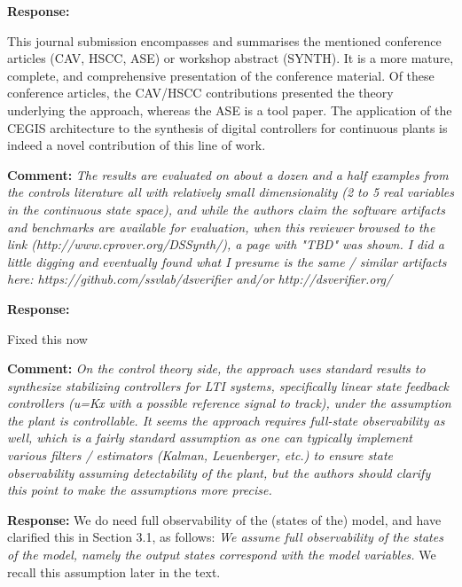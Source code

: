 \documentclass{article}
\begin{document}
{\bf Response: }

This journal submission encompasses and summarises the mentioned conference articles (CAV, HSCC, ASE) or workshop abstract (SYNTH). 
It is a more mature, complete, and comprehensive presentation of the conference material. 
Of these conference articles, the CAV/HSCC contributions presented the theory underlying the approach, 
whereas the ASE is a tool paper. 
The application of the CEGIS architecture to the synthesis of digital controllers for continuous plants is indeed a novel contribution of this line of
work. 


\vspace{2em}
{\bf Comment: } {\itshape The results are evaluated on about a dozen and a half examples from the controls literature all with relatively small
dimensionality (2 to 5 real variables in the continuous state space), and while the authors claim the software artifacts and benchmarks are available
for evaluation, when this reviewer browsed to the link (http://www.cprover.org/DSSynth/), a page with "TBD" was shown. I did a little digging and
eventually found what I presume is the same / similar artifacts here: https://github.com/ssvlab/dsverifier and/or http://dsverifier.org/}

\vspace{1em}
{\bf Response: }

Fixed this now


\vspace{2em}
{\bf Comment: } {\itshape On the control theory side, the approach uses standard results to synthesize stabilizing controllers for LTI systems,
specifically linear state feedback controllers (u=Kx with a possible reference signal to track), under the assumption the plant is controllable. It
seems the approach requires full-state observability as well, which is a fairly standard assumption as one can typically implement various filters /
estimators (Kalman, Leuenberger, etc.) to ensure state observability assuming detectability of the plant, but the authors should clarify this point to
make the assumptions more precise.}

\vspace{1em}
{\bf Response: }
We do need full observability of the (states of the) model, and have clarified this in Section 3.1, as follows: {\it We assume full observability of
the states of the model, namely the output states correspond with the model variables.  } We recall this assumption later in the text. 
\end{document}

